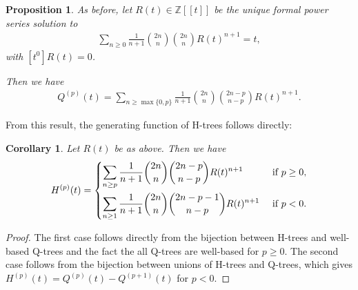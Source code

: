 \documentclass[11pt]{article}
\theoremstyle{plain}
\newtheorem{corollary}[theorem]{Corollary}
\newtheorem{proposition}[theorem]{Proposition}
\theoremstyle{definition}
\newcommand{\Z}{\mathbb{Z}}
\begin{document}
\begin{proposition}\label{prop:gen_Q_tree}
    As before, let $R(t)\in\Z[[t]]$ be the unique formal power series solution to
    \begin{align}
        \sum_{n\geq0}\frac{1}{n+1}\binom{2n}{n}\binom{2n}{n} R(t)^{n+1} = t,
    \end{align}
    with $[t^0]R(t)=0$.

    Then we have
    \begin{align}
        Q^{(p)}(t)=\sum_{n\geq \max\{0,p\}}\frac{1}{n+1}\binom{2n}{n}\binom{2n-p}{n-p} R(t)^{n+1}.
    \end{align}
\end{proposition}
From this result, the generating function of H-trees follows directly:
\begin{corollary}\label{coro:H_gen_fun}
    Let $R(t)$ be as above. 
    Then we have
    \begin{align}
        H^{(p)}(t)=\begin{dcases}
            \sum_{n\geq p}\frac{1}{n+1}\binom{2n}{n}\binom{2n-p}{n-p} R(t)^{n+1} & \textrm{ if } p\geq0, \\
            \sum_{n\geq 1}\frac{1}{n+1}\binom{2n}{n}\binom{2n-p-1}{n-p} R(t)^{n+1} & \textrm{ if } p<0.
        \end{dcases}
    \end{align}
\end{corollary}
\begin{proof}
    The first case follows directly from the bijection between H-trees and well-based Q-trees and the fact the all Q-trees are well-based for $p\geq0$.
    The second case follows from the bijection between unions of H-trees and Q-trees, which gives $H^{(p)}(t)=Q^{(p)}(t)-Q^{(p+1)}(t)$ for $p<0$.
\end{proof}
\end{document}
